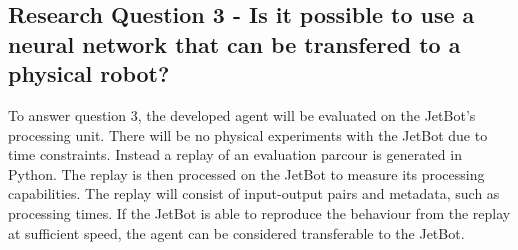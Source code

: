 \subsection{Research Question 3 - Is it possible to use a neural network that can be transfered to a physical robot?}

To answer question 3, the developed agent will be evaluated on the JetBot's processing unit. There will be no physical experiments with the JetBot due to time constraints. Instead a replay of an evaluation parcour is generated in Python. The replay is then processed on the JetBot to measure its processing capabilities. The replay will consist of input-output pairs and metadata, such as processing times. If the JetBot is able to reproduce the behaviour from the replay at sufficient speed, the agent can be considered transferable to the JetBot.


